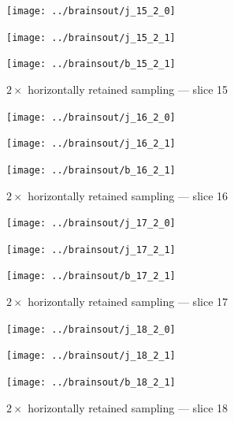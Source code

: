 \documentclass{article}
\begin{document}
\begin{figure}
\begin{centering}

\parbox{\imsizes}{\texttt{[image: ../brainsout/j\_15\_2\_0]}}

\vspace{\vertseps}

\parbox{\imsizes}{\texttt{[image: ../brainsout/j\_15\_2\_1]}}
\hfill
\parbox{\imsizes}{\texttt{[image: ../brainsout/b\_15\_2\_1]}}

\end{centering}
\caption{$2\times$ horizontally retained sampling --- slice 15}
\end{figure}


\begin{figure}
\begin{centering}

\parbox{\imsizes}{\texttt{[image: ../brainsout/j\_16\_2\_0]}}

\vspace{\vertseps}

\parbox{\imsizes}{\texttt{[image: ../brainsout/j\_16\_2\_1]}}
\hfill
\parbox{\imsizes}{\texttt{[image: ../brainsout/b\_16\_2\_1]}}

\end{centering}
\caption{$2\times$ horizontally retained sampling --- slice 16}
\end{figure}


\begin{figure}
\begin{centering}

\parbox{\imsizes}{\texttt{[image: ../brainsout/j\_17\_2\_0]}}

\vspace{\vertseps}

\parbox{\imsizes}{\texttt{[image: ../brainsout/j\_17\_2\_1]}}
\hfill
\parbox{\imsizes}{\texttt{[image: ../brainsout/b\_17\_2\_1]}}

\end{centering}
\caption{$2\times$ horizontally retained sampling --- slice 17}
\end{figure}


\begin{figure}
\begin{centering}

\parbox{\imsizes}{\texttt{[image: ../brainsout/j\_18\_2\_0]}}

\vspace{\vertseps}

\parbox{\imsizes}{\texttt{[image: ../brainsout/j\_18\_2\_1]}}
\hfill
\parbox{\imsizes}{\texttt{[image: ../brainsout/b\_18\_2\_1]}}

\end{centering}
\caption{$2\times$ horizontally retained sampling --- slice 18}
\end{figure}
\end{document}

